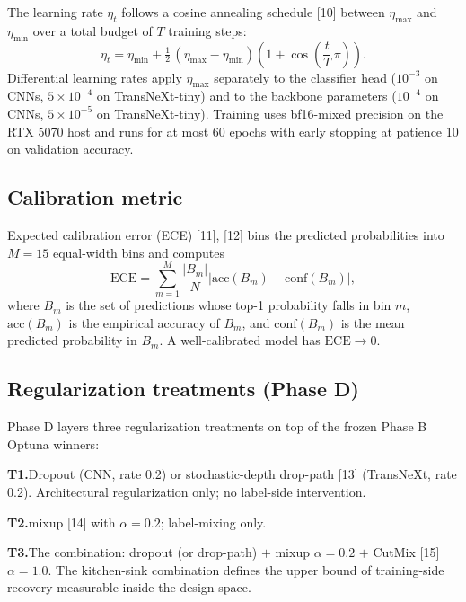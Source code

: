 The learning rate $\eta_t$ follows a cosine annealing schedule
[10] between $\eta_{\max}$ and $\eta_{\min}$ over a
total budget of $T$ training steps:
\begin{equation}
  \eta_t = \eta_{\min} + \tfrac{1}{2}\, (\eta_{\max} - \eta_{\min}) \!\left(
    1 + \cos\!\left( \frac{t}{T}\, \pi \right)
  \right).
  \label{eq:cosine}
\end{equation}
Differential learning rates apply $\eta_{\max}$ separately to the
classifier head ($10^{-3}$ on CNNs, $5 \times 10^{-4}$ on TransNeXt-tiny)
and to the backbone parameters ($10^{-4}$ on CNNs, $5 \times 10^{-5}$ on
TransNeXt-tiny). Training uses bf16-mixed precision on the RTX 5070 host
and runs for at most 60 epochs with early stopping at patience 10 on
validation accuracy.

\subsection{Calibration metric}
\label{sec:design:ece}

Expected calibration error (ECE) [11], [12]
bins the predicted probabilities into $M = 15$ equal-width bins and computes
\begin{equation}
  \mathrm{ECE} = \sum_{m=1}^{M} \frac{|B_m|}{N} \left| \mathrm{acc}(B_m) - \mathrm{conf}(B_m) \right|,
  \label{eq:ece}
\end{equation}
where $B_m$ is the set of predictions whose top-1 probability falls in bin
$m$, $\mathrm{acc}(B_m)$ is the empirical accuracy of $B_m$, and
$\mathrm{conf}(B_m)$ is the mean predicted probability in $B_m$. A
well-calibrated model has $\mathrm{ECE} \to 0$.

\subsection{Regularization treatments (Phase D)}
\label{sec:design:phase_d}

Phase D layers three regularization treatments on top of the frozen
Phase B Optuna winners:

\textbf{T1.}\quad Dropout (CNN, rate 0.2) or stochastic-depth drop-path
[13] (TransNeXt, rate 0.2). Architectural regularization
only; no label-side intervention.

\textbf{T2.}\quad mixup [14] with $\alpha = 0.2$;
label-mixing only.

\textbf{T3.}\quad The combination: dropout (or drop-path)
$+$ mixup $\alpha = 0.2$ $+$ CutMix [15] $\alpha = 1.0$.
The kitchen-sink combination defines the upper bound of training-side
recovery measurable inside the design space.

